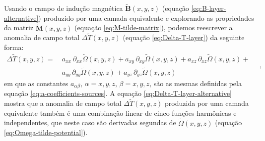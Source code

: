 Usando o campo de indução magnética $\tilde{\mathbf{B}}(x, y, z)$ (equação \ref{eq:B-layer-alternative}) produzido 
por uma camada equivalente e explorando as propriedades da matriz 
$\tilde{\mathbf{M}}(x, y, z)$ (equação \ref{eq:M-tilde-matrix}), podemos reescrever a anomalia de campo total 
$\Delta \tilde{T}(x, y, z)$ (equação \ref{eq:Delta-T-layer}) da seguinte forma:
\begin{equation}
	\begin{split}
		\Delta \tilde{T}(x, y, z) = \:
		& a_{xx} \, \partial_{xx} \tilde{\Omega}(x, y, z) + 
		a_{xy} \, \partial_{xy} \tilde{\Omega}(x, y, z) + 
		a_{xz} \, \partial_{xz} \tilde{\Omega}(x, y, z) + \\
		& a_{yy} \, \partial_{yy} \tilde{\Omega}(x, y, z) + 
		a_{yz} \, \partial_{yz} \tilde{\Omega}(x, y, z)
	\end{split} \quad ,
	\label{eq:Delta-T-layer-alternative}
\end{equation}
em que as constantes $a_{\alpha\beta}$, $\alpha = x, y, z$, $\beta = x, y, z$, são as mesmas 
definidas pela equação \ref{eq:a-coefficients-sources}. 
A equação \ref{eq:Delta-T-layer-alternative} mostra que a anomalia de campo 
total $\Delta \tilde{T}(x, y, z)$ produzida por uma camada equivalente também é 
uma combinação linear de cinco funções harmônicas e independentes, que neste caso 
são derivadas segundas de $\tilde{\Omega}(x, y, z)$ (equação \ref{eq:Omega-tilde-potential}).

